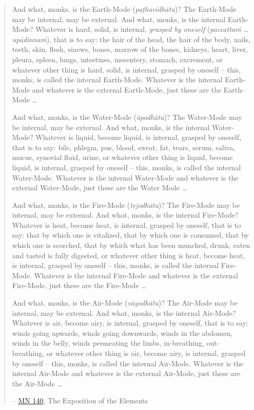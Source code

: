 \begin{quote}
And what, monks, is the Earth-Mode (\textit{paṭhavīdhātu})? The Earth-Mode may be internal, may be external. And what, monks, is the internal Earth-Mode? Whatever is hard, solid, is internal, \emph{grasped by oneself} (\textit{paccattaṁ \ldots{} upādinnaṁ}), that is to say: the hair of the head, the hair of the body, nails, teeth, skin, flesh, sinews, bones, marrow of the bones, kidneys, heart, liver, pleura, spleen, lungs, intestines, mesentery, stomach, excrement, or whatever other thing is hard, solid, is internal, grasped by oneself -- this, monks, is called the internal Earth-Mode. Whatever is the internal Earth-Mode and whatever is the external Earth-Mode, just these are the Earth-Mode \ldots{}

And what, monks, is the Water-Mode (\textit{āpodhātu})? The Water-Mode may be internal, may be external. And what, monks, is the internal Water-Mode? Whatever is liquid, become liquid, is internal, grasped by oneself, that is to say: bile, phlegm, pus, blood, sweat, fat, tears, serum, saliva, mucus, synovial fluid, urine, or whatever other thing is liquid, become liquid, is internal, grasped by oneself -- this, monks, is called the internal Water-Mode. Whatever is the internal Water-Mode and whatever is the external Water-Mode, just these are the Water Mode \ldots{}

And what, monks, is the Fire-Mode (\textit{tejodhātu})? The Fire-Mode may be internal, may be external. And what, monks, is the internal Fire-Mode? Whatever is heat, become heat, is internal, grasped by oneself, that is to say: that by which one is vitalized, that by which one is consumed, that by which one is scorched, that by which what has been munched, drunk, eaten and tasted is fully digested, or whatever other thing is heat, become heat, is internal, grasped by oneself -- this, monks, is called the internal Fire-Mode. Whatever is the internal Fire-Mode and whatever is the external Fire-Mode, just these are the Fire-Mode \ldots{}

And what, monks, is the Air-Mode (\textit{vāyodhātu})? The Air-Mode may be internal, may be external. And what, monks, is the internal Air-Mode? Whatever is air, become airy, is internal, grasped by oneself, that is to say: winds going upwards, winds going downwards, winds in the abdomen, winds in the belly, winds permeating the limbs, in-breathing, out-breathing, or whatever other thing is air, become airy, is internal, grasped by oneself -- this, monks, is called the internal Air-Mode. Whatever is the internal Air-Mode and whatever is the external Air-Mode, just these are the Air-Mode \ldots{}

 -- \href{https://suttacentral.net/mn140/en/bodhi}{MN 140}, The Exposition of the Elements
\end{quote}

